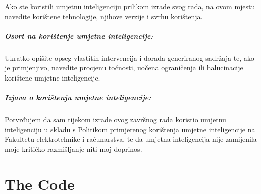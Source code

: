 \documentclass[zavrsnirad]{fer}
\begin{document}
  



  \begin{izjavaoui}

    Ako ste koristili umjetnu inteligenciju prilikom izrade svog rada,
    na ovom mjestu navedite korištene tehnologije, njihove verzije i svrhu korištenja.

    \paragraph{Osvrt na korištenje umjetne inteligencije:}
    Ukratko opišite opseg vlastitih intervencija i dorada generiranog sadržaja te, ako je primjenjivo,
    navedite procjenu točnosti, uočena ograničenja ili halucinacije korištene umjetne inteligencije.

    \paragraph{Izjava o korištenju umjetne inteligencije:}
    Potvrđujem da sam tijekom izrade ovog završnog rada koristio umjetnu inteligenciju u skladu s
    Politikom primjerenog korištenja umjetne inteligencije na Fakultetu elektrotehnike i računarstva,
    te da umjetna inteligencija nije zamijenila moje kritičko razmišljanje niti moj doprinos.

  \end{izjavaoui}



  \backmatter

  \chapter{The Code}

  \Blindtext


  
\end{document}
